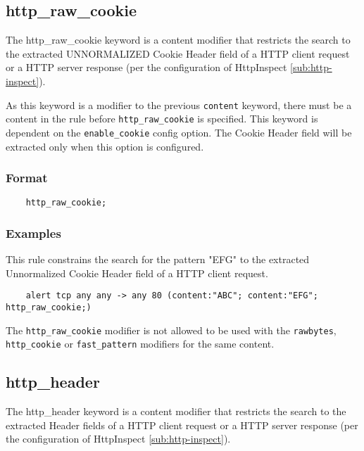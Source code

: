 \documentclass[english]{report}
\newenvironment{note}{
\samepage
    \vspace{10pt}{\textsf{
        {\hspace{7pt}\Huge{$\triangle$\hspace{-12.5pt}{\Large{$^!$}}}}\hspace{5pt}
        {\Large{NOTE}}
    }
    }
   \begin{center}
    \par\vspace{-17pt}

    \begin{lrbox}{\savepar}
    \begin{minipage}[r]{6in}
}
{
    \end{minipage}
    \end{lrbox}
    \fbox{
        \usebox{
            \savepar
	}
    }
    \par\vskip10pt
    \end{center}
}
\newenvironment{note}{
        \begin{rawhtml}
        <p><table border="1"><tr><td><b>
        Note:&nbsp;&nbsp;</b>
        \end{rawhtml}
}{
        \begin{rawhtml}
        </b></td></tr></table></p>
        \end{rawhtml}
}
\begin{document}
\subsection{http\_raw\_cookie}
\label{sub:RawHttpCookie}

The http\_raw\_cookie keyword is a content modifier that restricts the search to the
extracted UNNORMALIZED Cookie Header field of a HTTP client request or a HTTP server 
response (per the configuration of HttpInspect \ref{sub:http-inspect}).

As this keyword is a modifier to the previous \texttt{content} keyword, there must be
a content in the rule before \texttt{http\_raw\_cookie} is specified. This keyword is dependent
on the \texttt{enable\_cookie} config option. The Cookie Header field will be extracted only
when this option is configured.

\subsubsection{Format}

\begin{verbatim}
    http_raw_cookie;
\end{verbatim}

\subsubsection{Examples}

This rule constrains the search for the pattern "EFG" to the extracted Unnormalized
Cookie Header field of a HTTP client request.

\begin{verbatim}
    alert tcp any any -> any 80 (content:"ABC"; content:"EFG"; http_raw_cookie;)
\end{verbatim}

\begin{note}

The \texttt{http\_raw\_cookie} modifier is not allowed to be used with the
\texttt{rawbytes}, \texttt{http\_cookie} or \texttt{fast\_pattern} modifiers for the same 
content.

\end{note}

\subsection{http\_header}
\label{sub:HttpHeader}

The http\_header keyword is a content modifier that restricts the search to the
extracted Header fields of a HTTP client request or a HTTP server response (per the 
configuration of HttpInspect \ref{sub:http-inspect}).
\end{document}
